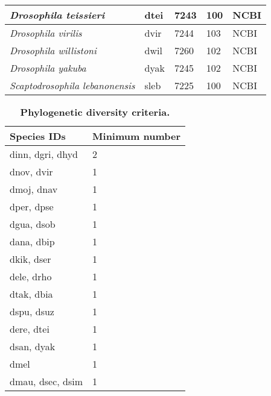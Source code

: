 \begin{table}[h!]
\begin{tabular}{|l|l|l|l|l|}
\textit{Drosophila teissieri}          & dtei                & 7243              & 100              & NCBI            \\ \hline
\textit{Drosophila virilis}            & dvir                & 7244              & 103              & NCBI            \\ \hline
\textit{Drosophila willistoni}         & dwil                & 7260              & 102              & NCBI            \\ \hline
\textit{Drosophila yakuba}             & dyak                & 7245              & 102              & NCBI            \\ \hline
\textit{Scaptodrosophila lebanonensis} & sleb                & 7225              & 100              & NCBI            \\ \hline
\end{tabular}
\label{stable:genomes}
\end{table}

\begin{table}[h!]
\centering
\caption{\textbf{Phylogenetic diversity criteria.}}
\begin{tabular}{|l|l|}
\hline
\textbf{Species   IDs} & \textbf{Minimum   number} \\ \hline
dinn,   dgri, dhyd     & 2                         \\ \hline
dnov,   dvir           & 1                         \\ \hline
dmoj,   dnav           & 1                         \\ \hline
dper,   dpse           & 1                         \\ \hline
dgua,   dsob           & 1                         \\ \hline
dana,   dbip           & 1                         \\ \hline
dkik,   dser           & 1                         \\ \hline
dele,   drho           & 1                         \\ \hline
dtak,   dbia           & 1                         \\ \hline
dspu,   dsuz           & 1                         \\ \hline
dere,   dtei           & 1                         \\ \hline
dsan,   dyak           & 1                         \\ \hline
dmel                   & 1                         \\ \hline
dmau,   dsec, dsim     & 1                         \\ \hline
\end{tabular}
\label{stable:diversity_criteria}
\end{table}
